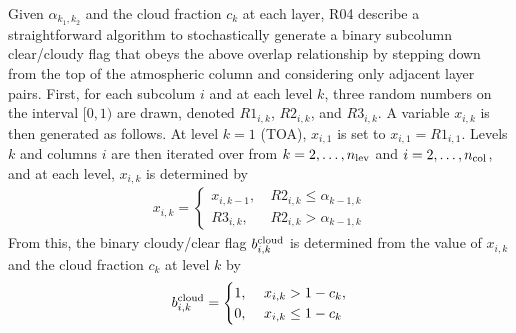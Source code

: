 Given $\alpha_{k_1, k_2}$ and the cloud fraction $c_{k}$ at each layer, R04 describe a straightforward algorithm to stochastically generate a binary subcolumn clear/cloudy flag that obeys the above overlap relationship by stepping down from the top of the atmospheric column and considering only adjacent layer pairs. First, for each subcolum $i$ and at each level $k$, three random numbers on the interval $[0, 1)$ are drawn, denoted $R1_{i, k}$, $R2_{i, k}$, and $R3_{i, k}$. A variable $x_{i, k}$ is then generated as follows. At level $k = 1$ (TOA), $x_{i, 1}$ is set to $x_{i, 1} = R1_{i, 1}$. Levels $k$ and columns $i$ are then iterated over from $k = 2, \ldots, n_{\rm lev}$ and $i = 2, \ldots, n_{\rm col}$, and at each level, $x_{i, k}$ is determined by
\begin{align}
    x_{i, k} = \begin{cases} 
        x_{i, k-1}, ~ & R2_{i, k} \le \alpha_{k-1, k} \\
        R3_{i, k}, ~ & R2_{i, k} > \alpha_{k-1, k}
    \end{cases}
\end{align}
From this, the binary cloudy/clear flag $b^{\rm cloud}_{i, k}$ is determined from the value of $x_{i, k}$ and the cloud fraction $c_{k}$ at level $k$ by
\begin{align}
    b^{\rm cloud}_{i, k} = \begin{cases}
        1, ~ & x_{i, k} > 1 - c_{k}, \\
        0, ~ & x_{i, k} \le 1 - c_{k}
    \end{cases}
\end{align}

